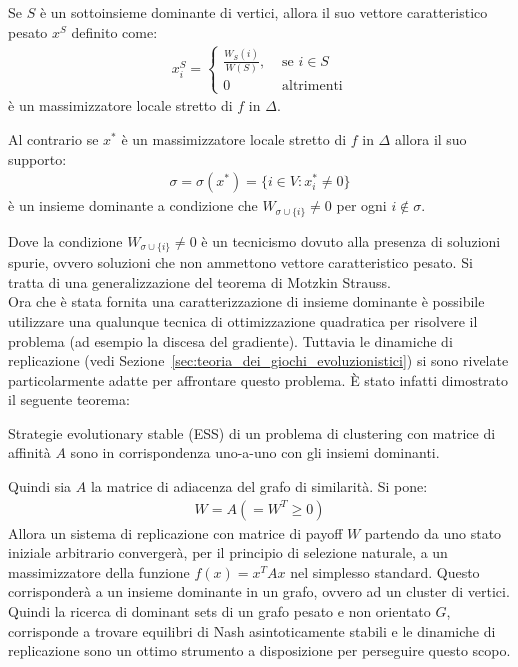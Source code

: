	\begin{thm}
		Se $S$ è un sottoinsieme dominante di vertici, allora il suo vettore caratteristico pesato $x^S$ definito come:
		\begin{align*}
			x^S_i = 
			\begin{cases}
				\frac{W_S(i)}{W(S)}, &\text{ se }i \in S\\
				0 &\text{ altrimenti}
			\end{cases}
		\end{align*}
		è un massimizzatore locale stretto di $f$ in $\Delta$.
	
		Al contrario se $x^*$ è un massimizzatore locale stretto di $f$ in $\Delta$ allora il suo supporto:
		\begin{align*}
			\sigma = \sigma(x^*) = \{ i \in V : x^*_i \neq 0 \}
		\end{align*}
		è un insieme dominante a condizione che $W_{\sigma \cup \{i\}} \neq 0$ per ogni $i \not\in \sigma$. 
	\end{thm}
	Dove la condizione $W_{\sigma \cup \{i\}} \neq 0$ è un tecnicismo dovuto alla presenza di soluzioni spurie, ovvero soluzioni che non ammettono vettore caratteristico pesato. Si tratta di una generalizzazione del teorema di Motzkin Strauss.\\

	Ora che è stata fornita una caratterizzazione di insieme dominante è possibile utilizzare una qualunque tecnica di ottimizzazione quadratica per risolvere il problema (ad esempio la discesa del gradiente). Tuttavia le dinamiche di replicazione (vedi Sezione~\ref{sec:teoria_dei_giochi_evoluzionistici}) si sono rivelate particolarmente adatte per affrontare questo problema. È stato infatti dimostrato il seguente teorema:

	\begin{thm}
		Strategie evolutionary stable (ESS) di un problema di clustering con matrice di affinità $A$ sono in corrispondenza uno-a-uno con gli insiemi dominanti.
	\end{thm}

	\newpage

	Quindi sia $A$ la matrice di adiacenza del grafo di similarità. Si pone:
	\begin{align*}
		W = A (= W^T \geq 0)
	\end{align*}
	Allora un sistema di replicazione con matrice di payoff $W$ partendo da uno stato iniziale arbitrario convergerà, per il principio di selezione naturale, a un massimizzatore della funzione $f(x) = x^T A x$ nel simplesso standard. Questo corrisponderà a un insieme dominante in un grafo, ovvero ad un cluster di vertici. Quindi la ricerca di dominant sets di un grafo pesato e non orientato $G$, corrisponde a trovare equilibri di Nash asintoticamente stabili e le dinamiche di replicazione sono un ottimo strumento a disposizione per perseguire questo scopo.\\

